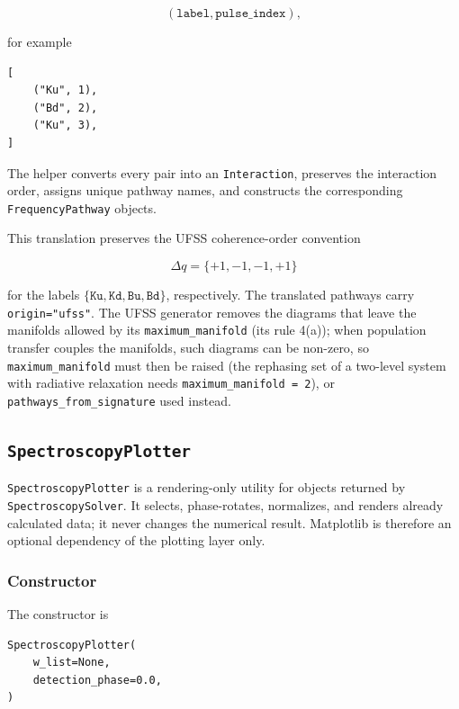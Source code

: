 \documentclass[11pt]{article}
\begin{document}
\begin{equation}
(\texttt{label},\texttt{pulse\_index}),
\end{equation}

for example

\begin{verbatim}
[
    ("Ku", 1),
    ("Bd", 2),
    ("Ku", 3),
]
\end{verbatim}

The helper converts every pair into an \texttt{Interaction}, preserves the
interaction order, assigns unique pathway names, and constructs the
corresponding \texttt{FrequencyPathway} objects.

This translation preserves the UFSS coherence-order convention

\begin{equation}
\Delta q = \{+1,-1,-1,+1\}
\end{equation}

for the labels
\(\{\texttt{Ku},\texttt{Kd},\texttt{Bu},\texttt{Bd}\}\), respectively. The translated pathways carry \texttt{origin="ufss"}. The UFSS generator removes the diagrams that leave the manifolds allowed by its \texttt{maximum\_manifold} (its rule 4(a)); when population transfer couples the manifolds, such diagrams can be non-zero, so \texttt{maximum\_manifold} must then be raised (the rephasing set of a two-level system with radiative relaxation needs \texttt{maximum\_manifold = 2}), or \texttt{pathways\_from\_signature} used instead.


\subsection{\texttt{SpectroscopyPlotter}}
\label{sec:plotter}

\texttt{SpectroscopyPlotter} is a rendering-only utility for objects returned by \texttt{SpectroscopySolver}. It selects, phase-rotates, normalizes, and renders already calculated data; it never changes the numerical result. Matplotlib is therefore an optional dependency of the plotting layer only.

\subsubsection{Constructor}

The constructor is

\begin{verbatim}
SpectroscopyPlotter(
    w_list=None,
    detection_phase=0.0,
)
\end{verbatim}
\end{document}
